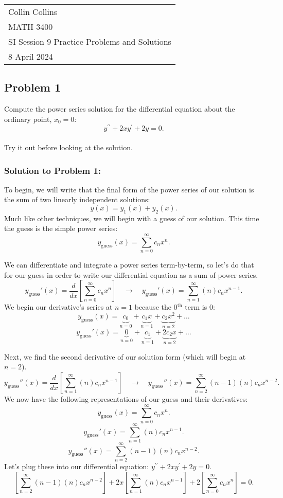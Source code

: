 \documentclass[a4paper,12pt]{article}
\begin{document}

\thispagestyle{empty}

\begin{tabular}{p{15.5cm}}
\\ Collin Collins \\
MATH 3400\\
SI Session 9 Practice Problems and Solutions\\
8 April 2024 \\
\hline

\end{tabular} 

\subsection*{Problem 1} Compute the power series solution for the differential equation about the ordinary point, $x_{0}=0$:
$$y^{\prime \prime}+2 x y^{\prime}+2 y=0. $$
\\
 
Try it out before looking at the solution.
\pagebreak
 
 \subsubsection*{Solution to Problem 1:}
 To begin, we will write that the final form of the power series of our solution is the sum of two linearly independent solutions:
 $$ y(x) = y_1(x) + y_2(x). $$
Much like other techniques, we will begin with a guess of our solution. This time the guess is the simple power series:
$$ y_{\text{guess}}(x) = \sum_{n=0}^{\infty} c_nx^n. $$

We can differentiate and integrate a power series term-by-term, so let's do that for our guess in order to write our differential equation as a sum of power series.
$$ y_{\text{guess}}'(x) = \frac{d}{dx}\left[\sum_{n=0}^{\infty} c_nx^n\right] \quad\rightarrow\quad y_{\text{guess}}'(x) = \sum_{n=1}^{\infty} (n)c_nx^{n-1}. $$
We begin our derivative's series at $n=1$ because the 0$^{\text{th}}$ term is 0:
$$ y_{\text{guess}}(x) = \underbrace{c_0}_{n=0} + \underbrace{c_1x}_{n=1} + \underbrace{c_2x^2}_{n=2}+\ldots $$
$$ y_{\text{guess}}'(x) = \underbrace{0}_{n=0} + \underbrace{c_1}_{n=1} + \underbrace{2c_2x}_{n=2} +\ldots $$

Next, we find the second derivative of our solution form (which will begin at $n=2$).
$$ y_{\text{guess}}''(x) = \frac{d}{dx}\left[\sum_{n=1}^{\infty} (n)c_nx^{n-1}\right] \quad\rightarrow\quad y_{\text{guess}}''(x)= \sum_{n=2}^{\infty} (n-1)(n)c_nx^{n-2}. $$
We now have the following representations of our guess and their derivatives:
$$ y_{\text{guess}}(x) = \sum_{n=0}^{\infty} c_nx^n. $$
$$ y_{\text{guess}}'(x) = \sum_{n=1}^{\infty} (n)c_nx^{n-1}. $$
$$ y_{\text{guess}}''(x)= \sum_{n=2}^{\infty} (n-1)(n)c_nx^{n-2}. $$
Let's plug these into our differential equation: $y^{\prime \prime}+2 x y^{\prime}+2 y=0.$
$$ \left[\sum_{n=2}^{\infty} (n-1)(n)c_nx^{n-2}\right] + 2x\left[\sum_{n=1}^{\infty} (n)c_nx^{n-1}\right] + 2\left[\sum_{n=0}^{\infty} c_nx^n\right]=0. $$
\pagebreak
\end{document}
